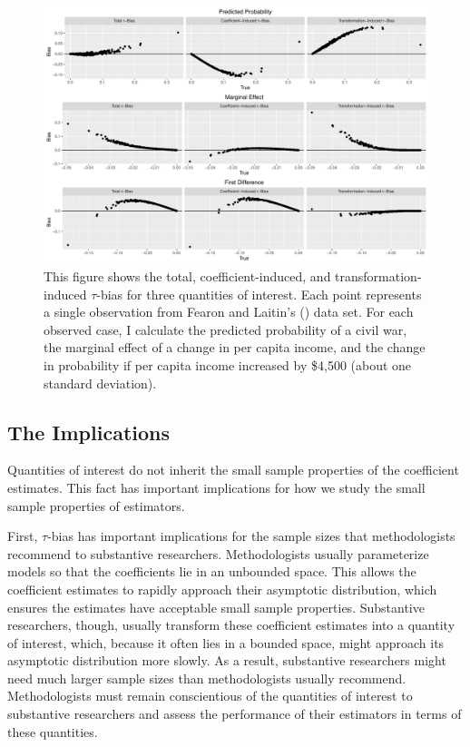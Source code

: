 \documentclass[12pt]{article}
\begin{document}
\begin{figure}[h!]
\begin{center}
\includegraphics[width = \textwidth]{figs/fl.pdf}
\caption{This figure shows the total, coefficient-induced, and transformation-induced $\tau$-bias for three quantities of interest. Each point represents a single observation from Fearon and Laitin's (\citeyear{FearonLaitin2003}) data set. For each observed case, I calculate the predicted probability of a civil war, the marginal effect of a change in per capita income, and the change in probability if per capita income increased by \$4,500 (about one standard deviation).}\label{fig:fl}
\end{center}
\end{figure}

\subsection*{The Implications}

Quantities of interest do not inherit the small sample properties of the coefficient estimates. 
This fact has important implications for how we study the small sample properties of estimators. 

First, $\tau$-bias has important implications for the sample sizes that methodologists recommend to substantive researchers. 
Methodologists usually parameterize models so that the coefficients lie in an unbounded space. 
This allows the coefficient estimates to rapidly approach their asymptotic distribution, which ensures the estimates have acceptable small sample properties. 
Substantive researchers, though, usually transform these coefficient estimates into a quantity of interest, which, because it often lies in a bounded space, might approach its asymptotic distribution more slowly. 
As a result, substantive researchers might need much larger sample sizes than methodologists usually recommend. Methodologists must remain conscientious of the quantities of interest to substantive researchers and assess the performance of their estimators in terms of these quantities.
\end{document}
